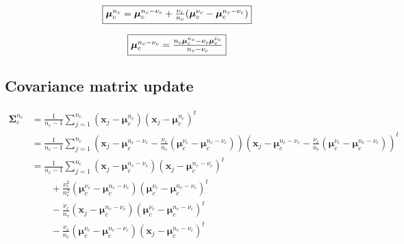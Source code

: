 \documentclass[a4paper,11pt,DIV=16]{scrartcl}
\begin{document}
        \begin{equation}
             \fbox{$\boldsymbol{\mu}_c^{n_c} = \boldsymbol{\mu}_c^{n_c-\nu_c} + \frac{\nu_c}{n_c} (\boldsymbol{\mu}_c^{\nu_c} - \boldsymbol{\mu}_c^{n_c-\nu_c})$}
        \end{equation}

        \begin{equation}
            \fbox{$\boldsymbol{\mu}_c^{n_c-\nu_c} = \frac{n_c \boldsymbol{\mu}_c^{n_c} - \nu_c \boldsymbol{\mu}_c^{\nu_c}}{n_c - \nu_c}$}
        \end{equation}

    \subsection{Covariance matrix update}
        \begin{align*}
            \boldsymbol{\Sigma}_c^{n_c} &= \frac{1}{n_c - 1} \sum_{j = 1}^{n_c} (\mathbf{x}_j - \boldsymbol{\mu}_c^{n_c}) (\mathbf{x}_j - \boldsymbol{\mu}_c^{n_c})^t \\
                           &= \frac{1}{n_c - 1} \sum_{j = 1}^{n_c} (\mathbf{x}_j - \boldsymbol{\mu}_c^{n_c-\nu_c} - \frac{\nu_c}{n_c} (\boldsymbol{\mu}_c^{\nu_c} - \boldsymbol{\mu}_c^{n_c-\nu_c})) (\mathbf{x}_j - \boldsymbol{\mu}_c^{n_c-\nu_c} - \frac{\nu_c}{n_c} (\boldsymbol{\mu}_c^{\nu_c} - \boldsymbol{\mu}_c^{n_c-\nu_c}))^t \\
                           &= \frac{1}{n_c - 1} \sum_{j = 1}^{n_c} (\mathbf{x}_j - \boldsymbol{\mu}_c^{n_c-\nu_c}) (\mathbf{x}_j - \boldsymbol{\mu}_c^{n_c-\nu_c})^t \\
                                                                 &\qquad + \frac{\nu_c^2}{n_c^2} (\boldsymbol{\mu}_c^{\nu_c}-\boldsymbol{\mu}_c^{n_c-\nu_c})(\boldsymbol{\mu}_c^{\nu_c}-\boldsymbol{\mu}_c^{n_c-\nu_c})^t \\
                                                                 &\qquad - \frac{\nu_c}{n_c} (\mathbf{x}_j-\boldsymbol{\mu}_c^{n_c-\nu_c})(\boldsymbol{\mu}_c^{\nu_c}-\boldsymbol{\mu}_c^{n_c-\nu_c})^t \\
                                                                 &\qquad - \frac{\nu_c}{n_c} (\boldsymbol{\mu}_c^{\nu_c}-\boldsymbol{\mu}_c^{n_c-\nu_c})(\mathbf{x}_j-\boldsymbol{\mu}_c^{n_c-\nu_c})^t
        \end{align*}
\end{document}
